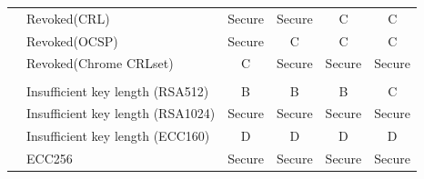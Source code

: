 \begin{table}[htbp]
\begin{tabular}{p{2.5cm}|p{8cm}|cccc}
                                                                                                    & Revoked(CRL)                                                                                        & Secure               & Secure               & C                    & C                    \\
                                                                                                    & Revoked(OCSP)                                                                              & Secure               & C                    & C                    & C                    \\
                                                                                                    & Revoked(Chrome CRLset)                                                                                       & C                    & Secure               & Secure               & Secure
                                                                                                    \\
                                                                                                    & \multicolumn{1}{l|}{}                                                                               & \multicolumn{1}{l}{} & \multicolumn{1}{l}{} & \multicolumn{1}{l}{} & \multicolumn{1}{l}{} \\
                                                                                                    & Insufficient key length (RSA512)                                                                    & B                    & B                    & B                    & C                    \\
                                                                                                    & Insufficient key length (RSA1024)                                                                   & Secure               & Secure               & Secure               & Secure               \\
                                                                                                    & Insufficient key length (ECC160)                                                                    & D                    & D                    & D                    & D                    \\
                                                                                                    & ECC256                                                                                              & Secure               & Secure               & Secure               & Secure               \\

\end{tabular}
\end{table}
